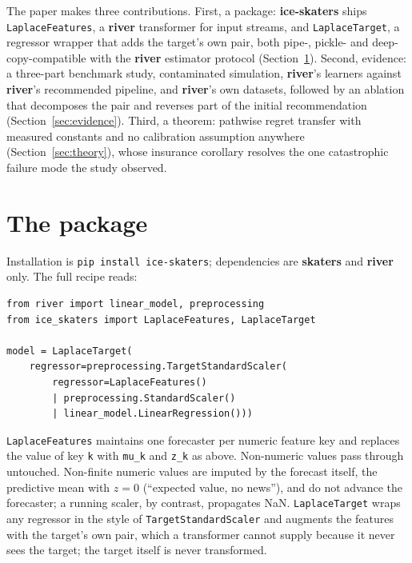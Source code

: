 \documentclass[article]{jss}
\providecommand{\pkg}[1]{\textbf{#1}}
\providecommand{\code}[1]{\texttt{#1}}
\theoremstyle{remark}
\begin{document}
The paper makes three contributions. First, a package: \pkg{ice-skaters}
ships \code{LaplaceFeatures}, a \pkg{river} transformer for input streams,
and \code{LaplaceTarget}, a regressor wrapper that adds the target's own
pair, both pipe-, pickle- and deep-copy-compatible with the \pkg{river}
estimator protocol (Section~\ref{sec:package}). Second, evidence: a
three-part benchmark study, contaminated simulation, \pkg{river}'s learners
against \pkg{river}'s recommended pipeline, and \pkg{river}'s own datasets,
followed by an ablation that decomposes the pair and reverses part of the
initial recommendation (Section~\ref{sec:evidence}). Third, a theorem:
pathwise regret transfer with measured constants and no calibration
assumption anywhere (Section~\ref{sec:theory}), whose insurance corollary
resolves the one catastrophic failure mode the study observed.

\section[The package]{The package} \label{sec:package}

Installation is \code{pip install ice-skaters}; dependencies are
\pkg{skaters} and \pkg{river} only. The full recipe reads:

\begin{verbatim}
from river import linear_model, preprocessing
from ice_skaters import LaplaceFeatures, LaplaceTarget

model = LaplaceTarget(
    regressor=preprocessing.TargetStandardScaler(
        regressor=LaplaceFeatures()
        | preprocessing.StandardScaler()
        | linear_model.LinearRegression()))
\end{verbatim}

\code{LaplaceFeatures} maintains one forecaster per numeric feature key and
replaces the value of key \code{k} with \code{mu\_k} and \code{z\_k} as
above. Non-numeric values pass through untouched. Non-finite numeric values
are imputed by the forecast itself, the predictive mean with $z = 0$
(``expected value, no news''), and do not advance the forecaster; a running
scaler, by contrast, propagates NaN. \code{LaplaceTarget} wraps any regressor
in the style of \code{TargetStandardScaler} and augments the features with
the target's own pair, which a transformer cannot supply because it never
sees the target; the target itself is never transformed.
\end{document}
